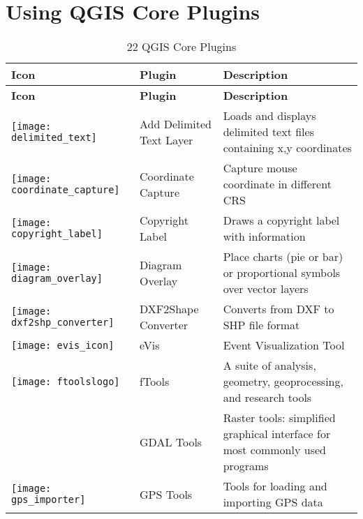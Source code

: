 
\chapter{Using QGIS Core Plugins}\label{sec:core_plugins}



{\setlength{\extrarowheight}{15pt}
\small
\begin{longtable}{|p{1.2cm}|p{3.8cm}|p{10.5cm}|}
\caption{22 QGIS Core Plugins}\label{tab:core_plugins} \\
\hline
 \textbf{Icon} & \textbf{Plugin} & \textbf{Description}\\
\endfirsthead
\hline
\textbf{Icon} & \textbf{Plugin} & \textbf{Description}\\
\endhead
\hline
\texttt{[image: delimited\_text]}
 & Add Delimited Text Layer \index{plugins!delimited text} & Loads and displays delimited text files containing x,y coordinates\\
\hline
\texttt{[image: coordinate\_capture]}
 & Coordinate Capture \index{plugins!coordinate capture}& Capture mouse coordinate in different CRS\\
\hline 
\texttt{[image: copyright\_label]}
 & Copyright Label \index{plugins!copyright}& Draws a copyright label with information\\
\hline
\texttt{[image: diagram\_overlay]}
 & Diagram Overlay \index{plugins!diagram}& Place charts (pie or bar) or proportional symbols over vector layers\\
\hline
\texttt{[image: dxf2shp\_converter]}
 & DXF2Shape Converter \index{plugins!DXF2Shape}& Converts from DXF to SHP file format\\
\hline
\texttt{[image: evis\_icon]}
 & eVis & Event Visualization Tool \\
\hline
\texttt{[image: ftoolslogo]}
 & fTools \index{plugins!ftools}& A suite of analysis, geometry, geoprocessing, and research tools\\
\hline
 & GDAL Tools \index{plugins!gdaltools} & Raster tools: simplified graphical interface for most commonly used programs\\
\hline
\texttt{[image: gps\_importer]}
 & GPS Tools \index{plugins!gps}& Tools for loading and importing GPS data\\

\end{longtable}}

